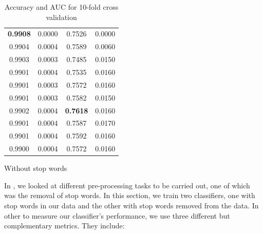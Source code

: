 \begin{table}
\begin{subtable}{.5\linewidth}
\begin{tabular}{cccc}
      \textbf{0.9908} & 0.0000        & 0.7526          & 0.0000 \\
      0.9904          & 0.0004        & 0.7589          & 0.0060 \\
      0.9903          & 0.0003        & 0.7485          & 0.0150 \\
      0.9901          & 0.0004        & 0.7535          & 0.0160 \\
      0.9901          & 0.0003        & 0.7572          & 0.0160 \\ \midrule
      0.9901          & 0.0003        & 0.7582          & 0.0150 \\
      0.9902          & 0.0004        & \textbf{0.7618} & 0.0160 \\
      0.9901          & 0.0004        & 0.7587          & 0.0170 \\
      0.9901          & 0.0004        & 0.7592          & 0.0160 \\
      0.9900          & 0.0004        & 0.7572          & 0.0160 \\ \bottomrule
    \end{tabular}
      \caption{Without stop words}
      \label{tab:data-without-stopwords}
  \end{subtable}
\caption{Accuracy and AUC for 10-fold cross validation}
\label{tab:with-without-stopwords-data-tables}
\end{table}

In , we looked at different pre-processing tasks to be
carried out, one of which was the removal of stop words. In this section, we train two classifiers,
one with stop words in our data and the other with stop words removed from the data. In other to
measure our classifier's performance, we use three different but complementary metrics. They
include:

